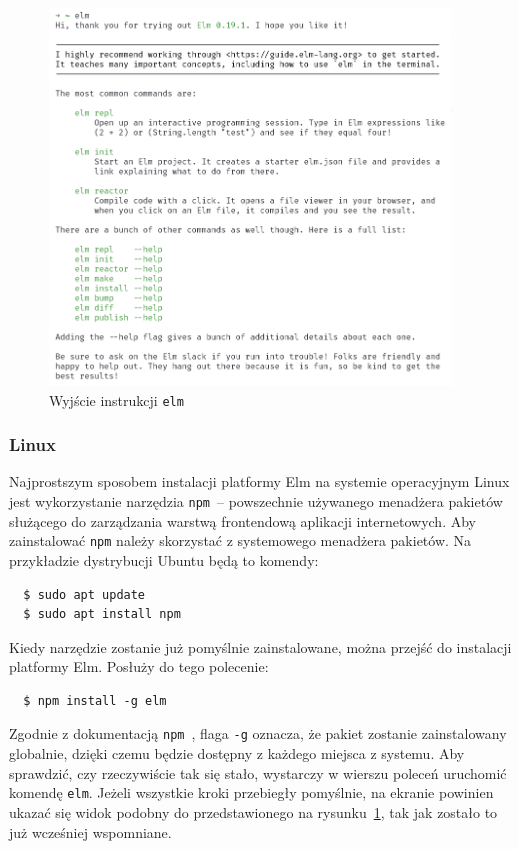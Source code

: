 \documentclass[twoside,a4paper]{report}
\begin{document}
\begin{figure}[H]
    \centering
    \includegraphics[width=0.95\textwidth]{img/elm_output.png}
    \caption{Wyjście instrukcji \texttt{elm}}\label{fig:elm_output}
\end{figure}

\subsubsection{Linux}
Najprostszym sposobem instalacji platformy Elm na systemie operacyjnym Linux jest wykorzystanie narzędzia \texttt{npm}~-- powszechnie używanego menadżera pakietów służącego do zarządzania warstwą frontendową aplikacji internetowych.
Aby zainstalować \texttt{npm} należy skorzystać z systemowego menadżera pakietów.
Na przykładzie dystrybucji Ubuntu będą to komendy:

\begin{lstlisting}
  $ sudo apt update
  $ sudo apt install npm
\end{lstlisting}

Kiedy narzędzie zostanie już pomyślnie zainstalowane, można przejść do instalacji platformy Elm.
Posłuży do tego polecenie:

\begin{lstlisting}
  $ npm install -g elm
\end{lstlisting}

Zgodnie z dokumentacją \texttt{npm}~\cite{npmdocs}, flaga \texttt{-g} oznacza, że pakiet zostanie zainstalowany globalnie, dzięki czemu będzie dostępny z każdego miejsca z systemu.
Aby sprawdzić, czy rzeczywiście tak się stało, wystarczy w wierszu poleceń uruchomić komendę \texttt{elm}.
Jeżeli wszystkie kroki przebiegły pomyślnie, na ekranie powinien ukazać się widok podobny do przedstawionego na rysunku~\ref{fig:elm_output}, tak jak zostało to już wcześniej wspomniane.
\end{document}
